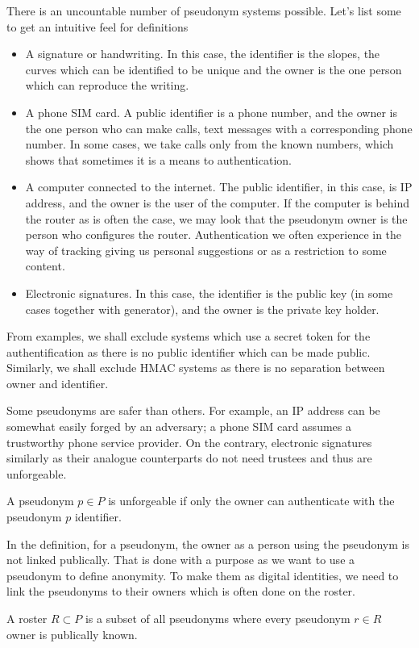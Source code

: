 \documentclass[12pt]{article}
\newenvironment{definition}[2][Definition]{\begin{trivlist}
\item[\hskip \labelsep {\bfseries #1}\hskip \labelsep {\bfseries #2.}]}{\end{trivlist}}
\begin{document}
There is an uncountable number of pseudonym systems possible. Let's list some to get an intuitive feel for definitions
\begin{itemize}
\item A signature or handwriting. In this case, the identifier is the slopes, the curves which can be identified to be unique and the owner is the one person which can reproduce the writing. 
\item A phone SIM card. A public identifier is a phone number, and the owner is the one person who can make calls, text messages with a corresponding phone number. In some cases, we take calls only from the known numbers, which shows that sometimes it is a means to authentication.
\item A computer connected to the internet. The public identifier, in this case, is IP address, and the owner is the user of the computer. If the computer is behind the router as is often the case, we may look that the pseudonym owner is the person who configures the router. Authentication we often experience in the way of tracking giving us personal suggestions or as a restriction to some content. 
\item Electronic signatures. In this case, the identifier is the public key (in some cases together with generator), and the owner is the private key holder. 
\end{itemize}
From examples, we shall exclude systems which use a secret token for the authentification as there is no public identifier which can be made public. Similarly, we shall exclude HMAC systems as there is no separation between owner and identifier. 

Some pseudonyms are safer than others. For example, an IP address can be somewhat easily forged by an adversary; a phone SIM card assumes a trustworthy phone service provider. On the contrary, electronic signatures similarly as their analogue counterparts do not need trustees and thus are unforgeable. 
\begin{definition}{(unforgeability)}
  A pseudonym $p \in P$ is unforgeable if only the owner can authenticate with the pseudonym $p$ identifier.
\end{definition}

In the definition, for a pseudonym, the owner as a person using the pseudonym is not linked publically. That is done with a purpose as we want to use a pseudonym to define anonymity. To make them as digital identities, we need to link the pseudonyms to their owners which is often done on the roster. 
\begin{definition}{(roster)}
  A roster $R \subset P$ is a subset of all pseudonyms where every pseudonym $r \in R$ owner is publically known.
\end{definition}
\end{document}
